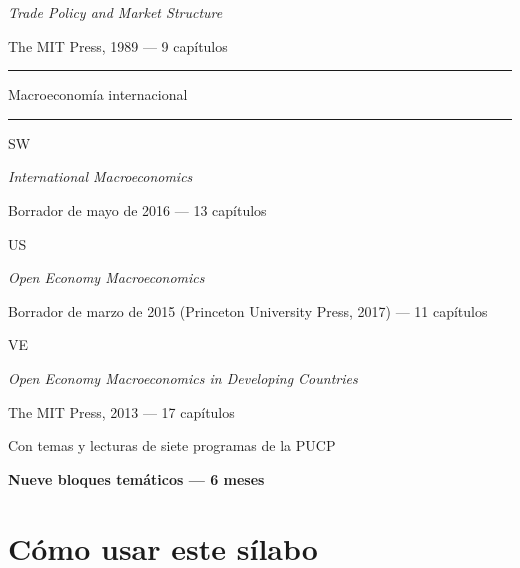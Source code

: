 \documentclass[11pt,a4paper]{article}
\newcommand{\etiqueta}[2]{%
  {\setlength{\fboxsep}{1.4pt}\colorbox{#1}{\sffamily\bfseries\color{white}\strut#2}}}
\begin{document}
\begin{titlepage}
{\normalsize \emph{\color{colorHK}Trade Policy and Market Structure}\par}
{\small\color{tonoPizarra} The MIT Press, 1989 --- 9 capítulos\par}
\vspace{0.6cm}
{\sffamily\large\bfseries\color{tonoPrincipal}\textcolor{tonoClaro}{\rule[0.5ex]{1.5cm}{0.6pt}}\quad Macroeconomía internacional\quad\textcolor{tonoClaro}{\rule[0.5ex]{1.5cm}{0.6pt}}\par}
\vspace{0.3cm}
{\large\etiqueta{colorSW}{SW} \par}
{\normalsize \emph{\color{colorSW}International Macroeconomics}\par}
{\small\color{tonoPizarra} Borrador de mayo de 2016 --- 13 capítulos\par}
\vspace{0.2cm}
{\large\etiqueta{colorUS}{US} \par}
{\normalsize \emph{\color{colorUS}Open Economy Macroeconomics}\par}
{\small\color{tonoPizarra} Borrador de marzo de 2015 (Princeton University Press, 2017) --- 11 capítulos\par}
\vspace{0.2cm}
{\large\etiqueta{colorVE}{VE} \par}
{\normalsize \emph{\color{colorVE}Open Economy Macroeconomics in Developing Countries}\par}
{\small\color{tonoPizarra} The MIT Press, 2013 --- 17 capítulos\par}
\vspace{0.5cm}
{\normalsize\color{colorPUCP} Con temas y lecturas de siete programas de la PUCP\par}
\vfill
{\setlength{\fboxsep}{6pt}\colorbox{tonoPrincipal}{\normalsize\sffamily\bfseries\color{white} Nueve bloques temáticos --- 6 meses}\par}
\vspace{0.2cm}
\end{titlepage}

\tableofcontents
\newpage

\section*{Cómo usar este sílabo}
\end{document}
